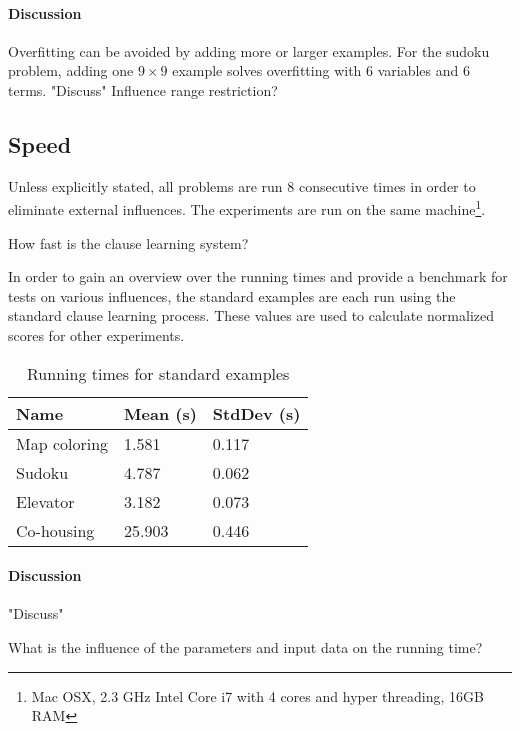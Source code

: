 \paragraph{Discussion}
	Overfitting can be avoided by adding more or larger examples.
	For the sudoku problem, adding one $9 \times 9$ example solves overfitting with $6$ variables and $6$ terms.
"Discuss"
Influence range restriction?


\subsection{Speed}

Unless explicitly stated, all problems are run $8$ consecutive times in order to eliminate external influences.
The experiments are run on the same machine\footnote{Mac OSX, 2.3 GHz Intel Core i7 with 4 cores and hyper threading, 16GB RAM}.

\begin{question}
	How fast is the clause learning system?
\end{question}

\begin{experiment}
	In order to gain an overview over the running times and provide a benchmark for tests on various influences, the standard examples are each run using the standard clause learning process.
	These values are used to calculate normalized scores for other experiments.
	
	\begin{table}[!htp]
		\begin{tabularx}{\textwidth}{XXX}
			\textbf{Name}	& \textbf{Mean (s)}	& \textbf{StdDev (s)} \\
			\toprule
			Map coloring 	& 1.581				& 0.117 \\
			Sudoku 			& 4.787				& 0.062 \\
			Elevator 		& 3.182 			& 0.073 \\
			Co-housing 		& 25.903			& 0.446
		\end{tabularx}
		\label{tbl:exp_speed_standard}
		\caption{Running times for standard examples}
	\end{table}

\end{experiment}

\paragraph{Discussion}
"Discuss"

\begin{question}
	What is the influence of the parameters and input data on the running time?
\end{question}

